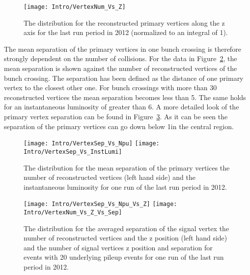 \begin{figure}[!Hhtb]
  \centering
  \texttt{[image: Intro/VertexNum\_Vs\_Z]}
  \caption[Vertex distribution along z]{The distribution for the reconstructed primary vertices along the z axis for the last run period in 2012 (normalized to an integral of 1). \label{plot:IntroVertexPos}}
\end{figure}

The mean separation of the primary vertices in one bunch crossing is therefore strongly dependent on the number of collisions. For the data in Figure~\ref{plot:IntroVertexSep}, the mean separation is shown against the number of reconstructed vertices of the bunch crossing. The separation has been defined as the distance of one primary vertex to the closest other one. For bunch crossings with more than 30 reconstructed vertices the mean separation becomes less than 5\mm. The same holds for an instantaneous luminosity of greater than 6\hertzpernbarn. A more detailed look of the primary vertex separation can be found in Figure~\ref{plot:IntroVertexSep2D}. As it can be seen the separation of the primary vertices can go down below 1\mm in the central region. 

\begin{figure}[!Hhtb]
  \centering
  \texttt{[image: Intro/VertexSep\_Vs\_Npu]}
  \texttt{[image: Intro/VertexSep\_Vs\_InstLumi]}
  \caption[Mean vertex separation \vs number of reconstructed vertices and \vs instantaneous luminosity]{The distribution for the mean separation of the primary vertices \vs the number of reconstructed vertices (left hand side) and \vs the instantaneous luminosity for one run of the last run period in 2012. \label{plot:IntroVertexSep}}
\end{figure}

\begin{figure}[!Hhtb]
  \centering
  \texttt{[image: Intro/VertexSep\_Vs\_Npu\_Vs\_Z]}
  \texttt{[image: Intro/VertexNum\_Vs\_Z\_Vs\_Sep]}
  \caption[Vertex separation \vs number of reconstructed vertices and \vs z position of the vertex. Number of signal vertices \vs z position and separation for events with 20 underlying pileup events]{The distribution for the averaged separation of the signal vertex \vs the number of reconstructed vertices and the z position (left hand side) and the number of signal vertices \vs z position and separation for events with 20 underlying pileup events for one run of the last run period in 2012. \label{plot:IntroVertexSep2D}}
\end{figure}

